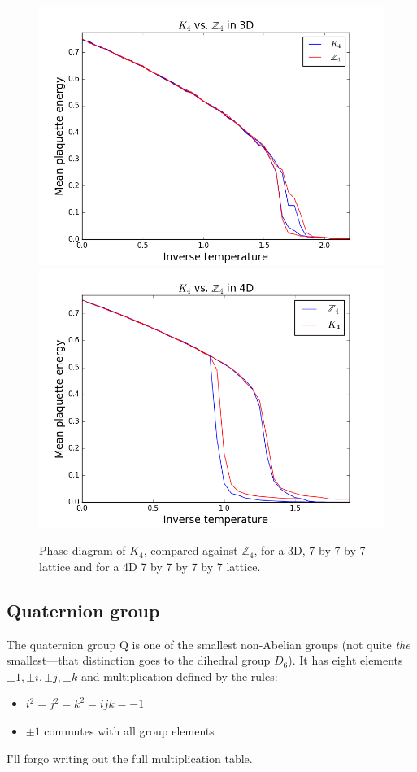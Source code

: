 \documentclass[9pt,twocolumn,twoside]{article}
\begin{document}
\begin{figure}[h!]
	\begin{centering}
	\includegraphics[width=\columnwidth]{k4vz4,3d}
	\includegraphics[width=\columnwidth]{k4vz4,4d}
	\caption{Phase diagram of $K_4$, compared against $\mathbb{Z}_4$, for a 3D, 7 by 7 by 7 lattice and for a 4D 7 by 7 by 7 by 7 lattice.}
	\label{k4vz4}
	\end{centering}
\end{figure}

\subsection{Quaternion group}
The quaternion group Q is one of the smallest non-Abelian groups (not quite \textit{the} smallest---that distinction goes to the dihedral group $D_6$).  It has eight elements $\pm1,\pm i, \pm j, \pm k$ and multiplication defined by the rules:
\begin{itemize}
\item $i^2=j^2=k^2=ijk=-1$
\item $\pm1$ commutes with all group elements
\end{itemize}
I'll forgo writing out the full multiplication table.  
\end{document}
